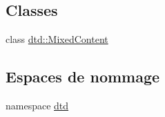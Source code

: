 \subsection*{Classes}
\begin{DoxyCompactItemize}
\item 
class \hyperlink{classdtd_1_1_mixed_content}{dtd::MixedContent}
\end{DoxyCompactItemize}
\subsection*{Espaces de nommage}
\begin{DoxyCompactItemize}
\item 
namespace \hyperlink{namespacedtd}{dtd}
\end{DoxyCompactItemize}
